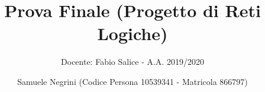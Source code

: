\documentclass[12pt]{scrartcl}
\title{Prova Finale (Progetto di Reti Logiche)}
\subtitle{Docente: Fabio Salice - A.A. 2019/2020}
\author{Samuele Negrini (Codice Persona 10539341 - Matricola 866797)}
\date{}
\begin{document}
	\thispagestyle{empty}
	\maketitle
	
	\renewcommand{\contentsname}{Indice}
	\tableofcontents
	
	
	
	
	
	
	
	
	
	
\end{document}
